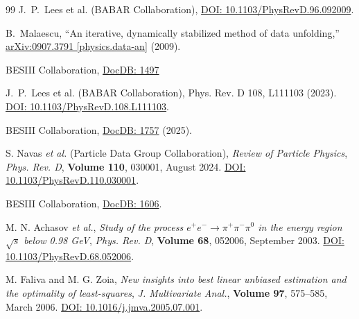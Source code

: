 \begin{thebibliography}{99}
    J.~P.~Lees et al. (BABAR Collaboration),
    \href{https://doi.org/10.1103/PhysRevD.96.092009}{DOI: 10.1103/PhysRevD.96.092009}.


    B.~Malaescu,
    ``An iterative, dynamically stabilized method of data unfolding,''
    \href{https://doi.org/10.48550/arXiv.0907.3791}{arXiv:0907.3791 [physics.data-an]} (2009).

    BESIII Collaboration,
    \href{https://docbes3.ihep.ac.cn/cgi-bin/DocDB/ShowDocument?docid=1497}{DocDB: 1497}

    J.~P.~Lees et al. (BABAR Collaboration),
    Phys. Rev. D 108, L111103 (2023).
    \href{https://doi.org/10.1103/PhysRevD.108.L111103}{DOI: 10.1103/PhysRevD.108.L111103}.

    BESIII Collaboration,
    \href{https://docbes3.ihep.ac.cn/cgi-bin/DocDB/ShowDocument?docid=1757}{DocDB: 1757} (2025).

    S. Navas \textit{et al.} (Particle Data Group Collaboration),
    \emph{Review of Particle Physics},
    \emph{Phys. Rev. D}, \textbf{Volume 110}, 030001, August 2024.
    \href{https://doi.org/10.1103/PhysRevD.110.030001}{DOI: 10.1103/PhysRevD.110.030001}.

    BESIII Collaboration,
    \href{https://docbes3.ihep.ac.cn/cgi-bin/DocDB/ShowDocument?docid=1606}{DocDB: 1606}.

    M. N. Achasov \textit{et al.},
    \emph{Study of the process $e^+e^-\to \pi^+\pi^-\pi^0$ in the energy region $\sqrt{s}$ below 0.98 GeV},
    \emph{Phys. Rev. D}, \textbf{Volume 68}, 052006, September 2003.
    \href{https://doi.org/10.1103/PhysRevD.68.052006}{DOI: 10.1103/PhysRevD.68.052006}.



    M. Faliva and M. G. Zoia,
    \emph{New insights into best linear unbiased estimation and the optimality of least-squares},
    \emph{J. Multivariate Anal.}, \textbf{Volume 97}, 575--585, March 2006.
    \href{https://doi.org/10.1016/j.jmva.2005.07.001}{DOI: 10.1016/j.jmva.2005.07.001}.


\end{thebibliography}